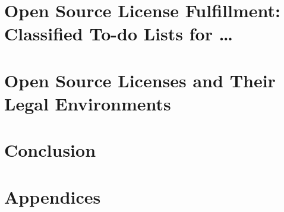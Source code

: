 \documentclass[DIV=calc,BCOR=5mm,12pt,headings=small,oneside,abstract=true,
toc=bib]{scrbook}
\begin{document}
\chapter{Open Source License Fulfillment: Classified To-do Lists for \ldots}








\chapter{Open Source Licenses and Their Legal Environments}



\chapter{Conclusion}



\chapter{Appendices}





\small


\footnotesize


\printnomenclature


\end{document}

